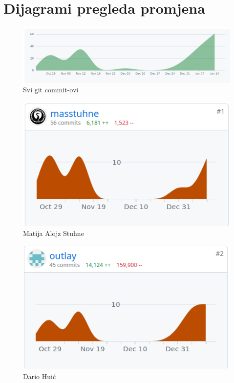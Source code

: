 		\section*{Dijagrami pregleda promjena}
		\begin{figure}[H]
			\includegraphics[scale=0.45]{slike/all_git.png} 
			\centering
			\caption{Svi git commit-ovi}
			\label{fig:all}
		\end{figure}
		\begin{figure}[H]
			\includegraphics[scale=0.45]{slike/masstuhne_git.png} 
			\centering
			\caption{Matija Alojz Stuhne}
			\label{fig:id5}
		\end{figure}
		\begin{figure}[H]
			\includegraphics[scale=0.45]{slike/outlay_git.png} 
			\centering
			\caption{Dario Huić}
			\label{fig:id1}
		\end{figure}

